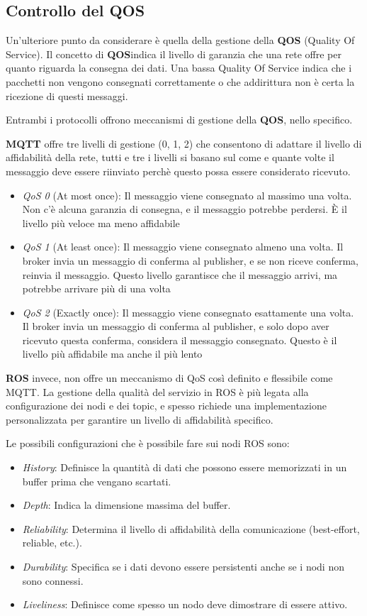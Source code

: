 \subsection{Controllo del QOS}
Un'ulteriore punto da considerare è quella della gestione della \textbf{QOS} (Quality Of Service). Il concetto di \textbf{QOS}indica il livello di garanzia che una rete offre per quanto riguarda la consegna dei dati. Una bassa Quality Of Service indica che i pacchetti non vengono consegnati correttamente o che addirittura non è certa la ricezione di questi messaggi.  

\noindent Entrambi i protocolli offrono meccanismi di gestione della \textbf{QOS}, nello specifico.

\noindent \textbf{MQTT} offre tre livelli di gestione (0, 1, 2) che consentono di adattare il livello di affidabilità della rete, tutti e tre i livelli si basano sul come e quante volte il messaggio deve essere riinviato perchè questo possa essere considerato ricevuto. 

\begin{itemize}
  \item \textit{QoS 0} (At most once): Il messaggio viene consegnato al massimo una volta. Non c'è alcuna garanzia di consegna, e il messaggio potrebbe perdersi. È il livello più veloce ma meno affidabile
  \item \textit{QoS 1} (At least once): Il messaggio viene consegnato almeno una volta. Il broker invia un messaggio di conferma al publisher, e se non riceve conferma, reinvia il messaggio. Questo livello garantisce che il messaggio arrivi, ma potrebbe arrivare più di una volta
  \item \textit{QoS 2} (Exactly once): Il messaggio viene consegnato esattamente una volta. Il broker invia un messaggio di conferma al publisher, e solo dopo aver ricevuto questa conferma, considera il messaggio consegnato. Questo è il livello più affidabile ma anche il più lento
\end{itemize}

\noindent \textbf{ROS} invece, non offre un meccanismo di QoS così definito e flessibile come MQTT. La gestione della qualità del servizio in ROS è più legata alla configurazione dei nodi e dei topic, e spesso richiede una implementazione personalizzata per garantire un livello di affidabilità specifico. 

Le possibili configurazioni che è possibile fare sui nodi ROS sono:
\begin{itemize}
  \item \textit{History}: Definisce la quantità di dati che possono essere memorizzati in un buffer prima che vengano scartati.
  \item \textit{Depth}: Indica la dimensione massima del buffer.
  \item \textit{Reliability}: Determina il livello di affidabilità della comunicazione (best-effort, reliable, etc.).
  \item \textit{Durability}: Specifica se i dati devono essere persistenti anche se i nodi non sono connessi.
  \item \textit{Liveliness}: Definisce come spesso un nodo deve dimostrare di essere attivo.
\end{itemize}


